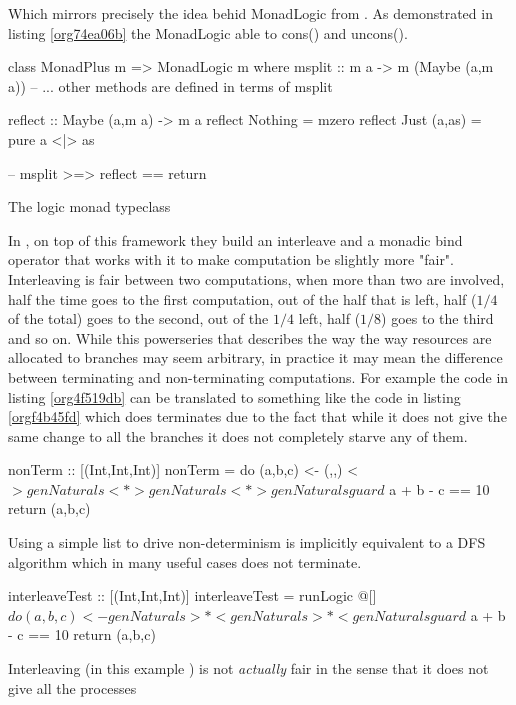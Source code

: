 Which mirrors precisely the idea behid MonadLogic from
\cite{kiselyovBacktrackingInterleavingTerminating}. As demonstrated in
listing \ref{org74ea06b} the MonadLogic able to cons() and
uncons().

\begin{code}
\begin{haskellcode}
class MonadPlus m => MonadLogic m where
  msplit :: m a -> m (Maybe (a,m a))
  -- ... other methods are defined in terms of msplit

reflect :: Maybe (a,m a) -> m a
reflect Nothing = mzero
reflect Just (a,as) = pure a <|> as

-- msplit >=> reflect == return
\end{haskellcode}
\caption{\label{org74ea06b}The logic monad typeclass}
\end{code}

In \cite{kiselyovBacktrackingInterleavingTerminating}, on top of this
framework they build an interleave and a monadic bind operator that
works with it to make computation be slightly more "fair".
Interleaving is fair between two computations, when more than two are
involved, half the time goes to the first computation, out of the half
that is left, half (\(1/4\) of the total) goes to the second, out of the
\(1/4\) left, half (\(1/8\)) goes to the third and so on. While this
powerseries that describes the way the way resources are allocated to
branches may seem arbitrary, in practice it may mean the difference
between terminating and non-terminating computations. For example the
code in listing \ref{org4f519db} can be translated to something like the
code in listing \ref{orgf4b45fd} which does terminates due to the fact that
while it does not give the same change to all the branches it does not
completely starve any of them.

\begin{code}
\begin{haskellcode}
nonTerm :: [(Int,Int,Int)]
nonTerm = do
  (a,b,c) <- (,,) <$> genNaturals <*> genNaturals <*> genNaturals
  guard $ a + b - c == 10
  return (a,b,c)
\end{haskellcode}
\caption{\label{org4f519db}Using a simple list to drive non-determinism is implicitly equivalent to a DFS algorithm which in many useful cases does not terminate.}
\end{code}

\begin{code}
\begin{haskellcode}
interleaveTest :: [(Int,Int,Int)]
interleaveTest = runLogic @[] $ do
  (a,b,c) <- genNaturals >*< genNaturals >*< genNaturals
  guard $ a + b - c == 10
  return (a,b,c)
\end{haskellcode}
\caption{\label{orgf4b45fd}Interleaving (in this example \hask{>*<}) is not \emph{actually} fair in the sense that it does not give all the processes}
\end{code}

